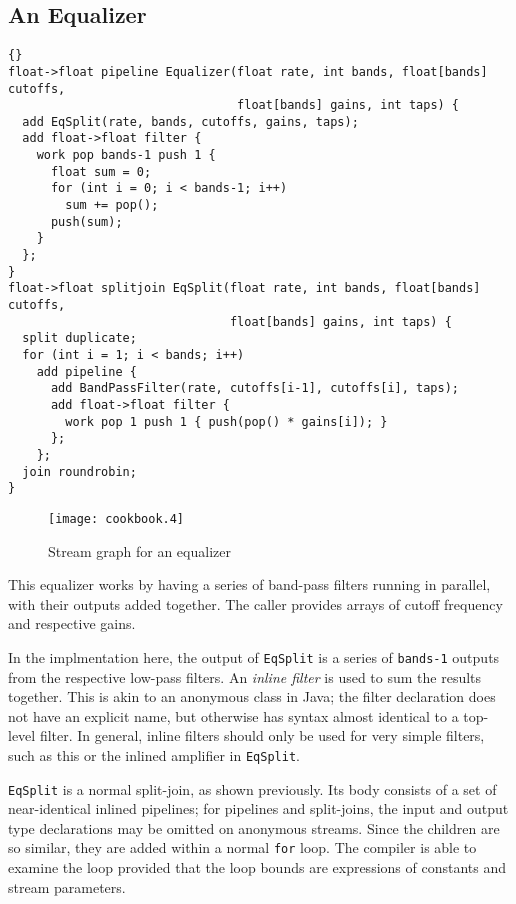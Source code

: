 \subsection{An Equalizer}

\begin{lstlisting}{}
float->float pipeline Equalizer(float rate, int bands, float[bands] cutoffs,
                                float[bands] gains, int taps) {
  add EqSplit(rate, bands, cutoffs, gains, taps);
  add float->float filter {
    work pop bands-1 push 1 {
      float sum = 0;
      for (int i = 0; i < bands-1; i++)
        sum += pop();
      push(sum);
    }
  };
}
float->float splitjoin EqSplit(float rate, int bands, float[bands] cutoffs,
                               float[bands] gains, int taps) {
  split duplicate;
  for (int i = 1; i < bands; i++)
    add pipeline {
      add BandPassFilter(rate, cutoffs[i-1], cutoffs[i], taps);
      add float->float filter {
        work pop 1 push 1 { push(pop() * gains[i]); }
      };
    };
  join roundrobin;
}
\end{lstlisting}

\begin{figure}[htbp]
  \begin{center}
    \texttt{[image: cookbook.4]}
    \caption{Stream graph for an equalizer}
    \label{fig:equalizer}
  \end{center}
\end{figure}

This equalizer works by having a series of band-pass filters running
in parallel, with their outputs added together.  The caller provides
arrays of cutoff frequency and respective gains.

In the implmentation here, the output of \lstinline|EqSplit| is a
series of \lstinline|bands-1| outputs from the respective low-pass
filters.  An \emph{inline filter} is used to sum the results
together.  This is akin to an anonymous class in Java; the filter
declaration does not have an explicit name, but otherwise has syntax
almost identical to a top-level filter.  In general, inline filters
should only be used for very simple filters, such as this or the
inlined amplifier in \lstinline|EqSplit|.

\lstinline|EqSplit| is a normal split-join, as shown previously.  Its
body consists of a set of near-identical inlined pipelines; for
pipelines and split-joins, the input and output type declarations may
be omitted on anonymous streams.  Since the children are so similar,
they are added within a normal \lstinline|for| loop.  The compiler is
able to examine the loop provided that the loop bounds are expressions
of constants and stream parameters.
